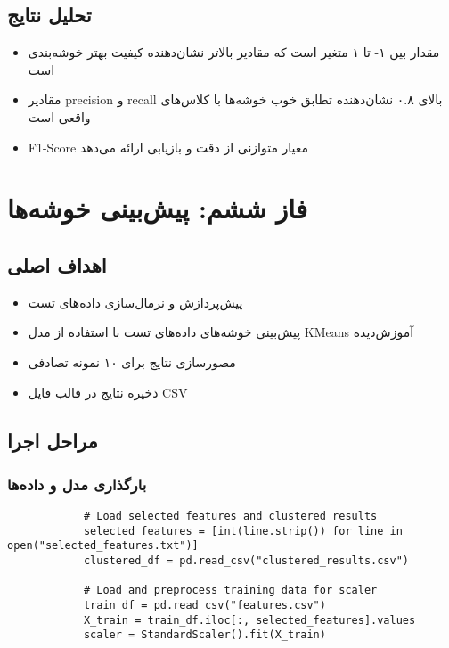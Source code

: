 \documentclass[a4paper,12pt]{article}
\let\nobreaksection\section
\renewcommand{\section}{\nobreaksection}  %
\begin{document}
	\subsection{تحلیل نتایج}
	\begin{itemize}
		\item مقدار  بین ۱- تا ۱ متغیر است که مقادیر بالاتر نشان‌دهنده کیفیت بهتر خوشه‌بندی است
		\item مقادیر precision و recall بالای ۰.۸ نشان‌دهنده تطابق خوب خوشه‌ها با کلاس‌های واقعی است
		\item F1-Score معیار متوازنی از دقت و بازیابی ارائه می‌دهد
	\end{itemize}
	
	\section{فاز ششم: پیش‌بینی خوشه‌ها}
	
	\subsection{اهداف اصلی}
	\begin{itemize}
		\item پیش‌پردازش و نرمال‌سازی داده‌های تست
		\item پیش‌بینی خوشه‌های داده‌های تست با استفاده از مدل KMeans آموزش‌دیده
		\item مصورسازی نتایج برای ۱۰ نمونه تصادفی
		\item ذخیره نتایج در قالب فایل CSV
	\end{itemize}
	
	\subsection{مراحل اجرا}
	
	\subsubsection{بارگذاری مدل و داده‌ها}
	\begin{latin}
		\begin{verbatim}
			# Load selected features and clustered results
			selected_features = [int(line.strip()) for line in open("selected_features.txt")]
			clustered_df = pd.read_csv("clustered_results.csv")
			
			# Load and preprocess training data for scaler
			train_df = pd.read_csv("features.csv")
			X_train = train_df.iloc[:, selected_features].values
			scaler = StandardScaler().fit(X_train)
		\end{verbatim}
	\end{latin}
	
\end{document}
